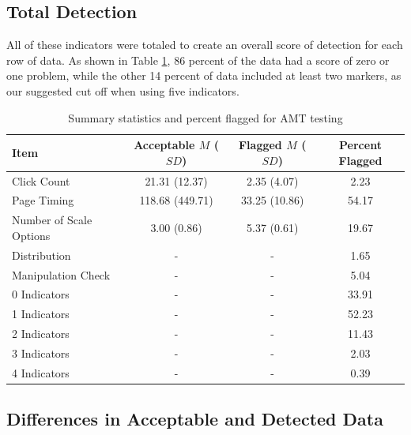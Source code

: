 \documentclass[english,man]{apa6}
\theoremstyle{definition}
\theoremstyle{definition}
\theoremstyle{definition}
\theoremstyle{remark}
\begin{document}
\subsection{Total Detection}\label{total-detection-1}

All of these indicators were totaled to create an overall score of
detection for each row of data. As shown in Table \ref{tab:amt-table1},
86 percent of the data had a score of zero or one problem, while the
other 14 percent of data included at least two markers, as our suggested
cut off when using five indicators.

\begin{table}[tbp]
\begin{center}
\begin{threeparttable}
\caption{\label{tab:amt-table1}Summary statistics and percent flagged for AMT testing}
\begin{tabular}{lccc}
\toprule
Item & \multicolumn{1}{c}{Acceptable $M$ ($SD$)} & \multicolumn{1}{c}{Flagged $M$ ($SD$)} & \multicolumn{1}{c}{Percent Flagged}\\
\midrule
Click Count & 21.31 (12.37) & 2.35 (4.07) & 2.23\\
Page Timing & 118.68 (449.71) & 33.25 (10.86) & 54.17\\
Number of Scale Options & 3.00 (0.86) & 5.37 (0.61) & 19.67\\
Distribution & - & - & 1.65\\
Manipulation Check & - & - & 5.04\\
0 Indicators & - & - & 33.91\\
1 Indicators & - & - & 52.23\\
2 Indicators & - & - & 11.43\\
3 Indicators & - & - & 2.03\\
4 Indicators & - & - & 0.39\\
\bottomrule
\end{tabular}
\end{threeparttable}
\end{center}
\end{table}

\subsection{Differences in Acceptable and Detected
Data}\label{differences-in-acceptable-and-detected-data}
\end{document}
